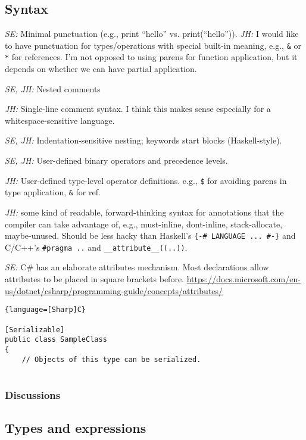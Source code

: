 \documentclass{article}
\begin{document}
\subsection{Syntax}

\textit{SE:} Minimal punctuation (e.g., print ``hello'' vs. print(``hello'')).
\textit{JH:} I would like to have punctuation for types/operations with special
built-in meaning, e.g., \verb|&| or \verb|*| for references. I'm not opposed to
using parens for function application, but it depends on whether we can have
partial application.

\textit{SE, JH:} Nested comments

\textit{JH:} Single-line comment syntax. I think this makes sense especially for
a whitespace-sensitive language.

\textit{SE, JH:} Indentation-sensitive nesting; keywords start blocks (Haskell-style).

\textit{SE, JH:} User-defined binary operators and precedence levels.

\textit{JH:} User-defined type-level operator definitions. e.g., \verb|$| for
avoiding parens in type application, \verb|&| for ref.

\textit{JH:} some kind of readable, forward-thinking syntax for annotations that
the compiler can take advantage of, e.g., must-inline, dont-inline,
stack-allocate, maybe-unused. Should be less hacky than Haskell's
\verb|{-# LANGUAGE ... #-}| and C/C++'s \verb|#pragma ..| and
\verb|__attribute__((..))|.

\textit{SE:} C\# has an elaborate attributes mechanism.
Most declarations allow attributes to be placed in square brackets before.  \url{https://docs.microsoft.com/en-us/dotnet/csharp/programming-guide/concepts/attributes/}

\begin{lstlisting}{language=[Sharp]C}
 
[Serializable]
public class SampleClass
{
    // Objects of this type can be serialized.
 
\end{lstlisting}

\subsubsection{Discussions}

\subsection{Types and expressions}
\end{document}
